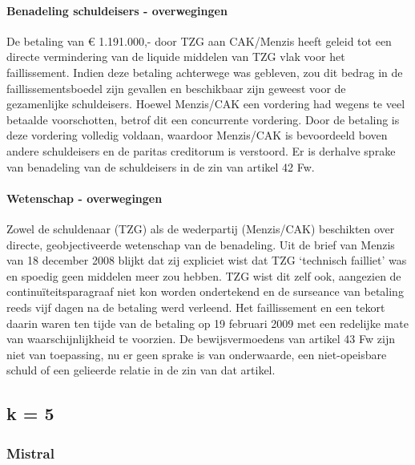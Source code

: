 \documentclass[
  dutch,
  a4paper,
]{article}
\begin{document}
\paragraph{Benadeling schuldeisers - overwegingen}\label{benadeling-schuldeisers---overwegingen-83}

De betaling van € 1.191.000,- door TZG aan CAK/Menzis heeft geleid tot een directe vermindering van de liquide middelen van TZG vlak voor het faillissement. Indien deze betaling achterwege was gebleven, zou dit bedrag in de faillissementsboedel zijn gevallen en beschikbaar zijn geweest voor de gezamenlijke schuldeisers. Hoewel Menzis/CAK een vordering had wegens te veel betaalde voorschotten, betrof dit een concurrente vordering. Door de betaling is deze vordering volledig voldaan, waardoor Menzis/CAK is bevoordeeld boven andere schuldeisers en de paritas creditorum is verstoord. Er is derhalve sprake van benadeling van de schuldeisers in de zin van artikel 42 Fw.

\paragraph{Wetenschap - overwegingen}\label{wetenschap---overwegingen-83}

Zowel de schuldenaar (TZG) als de wederpartij (Menzis/CAK) beschikten over directe, geobjectiveerde wetenschap van de benadeling. Uit de brief van Menzis van 18 december 2008 blijkt dat zij expliciet wist dat TZG `technisch failliet' was en spoedig geen middelen meer zou hebben. TZG wist dit zelf ook, aangezien de continuïteitsparagraaf niet kon worden ondertekend en de surseance van betaling reeds vijf dagen na de betaling werd verleend. Het faillissement en een tekort daarin waren ten tijde van de betaling op 19 februari 2009 met een redelijke mate van waarschijnlijkheid te voorzien. De bewijsvermoedens van artikel 43 Fw zijn niet van toepassing, nu er geen sprake is van onderwaarde, een niet-opeisbare schuld of een gelieerde relatie in de zin van dat artikel.

\newpage


\subsection{k = 5}\label{k-5-9}

\subsubsection{Mistral}\label{mistral-28}
\end{document}

